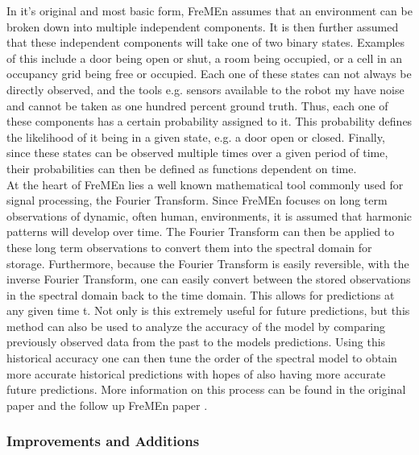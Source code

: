   In it's original and most basic form, FreMEn assumes that an environment can be
  broken down into multiple independent components. It is then further assumed
  that these independent components will take one of two binary states. Examples
  of this include a door being open or shut, a room being occupied, or a cell in
  an occupancy grid being free or occupied. Each one of these states can not
  always be directly observed, and the tools e.g. sensors available to the robot
  my have noise and cannot be taken as one hundred percent ground truth. Thus,
  each one of these components has a certain probability assigned to it. This
  probability defines the likelihood of it being in a given state, e.g. a door
  open or closed.  Finally, since these states can be observed multiple times
  over a given period of time, their probabilities can then be defined as
  functions dependent on time. \\

  At the heart of FreMEn lies a well known mathematical tool commonly used for
  signal processing, the Fourier Transform. Since FreMEn focuses on long term
  observations of dynamic, often human, environments, it is assumed that harmonic
  patterns will develop over time. The Fourier Transform can then be applied to
  these long term observations to convert them into the spectral domain for
  storage. Furthermore, because the Fourier Transform is easily reversible,
  with the inverse Fourier Transform, one can easily convert between the stored
  observations in the spectral domain back to the time domain. This allows for
  predictions at any given time t. Not only is this extremely useful for future
  predictions, but this method can also be used to analyze the accuracy of the
  model by comparing previously observed data from the past to the models
  predictions. Using this historical accuracy one can then tune the order of the
  spectral model to obtain more accurate historical predictions with hopes of
  also having more accurate future predictions. More information on this process
  can be found in the original paper\cite{Fentanes2014} and the follow up FreMEn
  paper \cite{Krajnik2015}. \\

  \subsubsection{ Improvements and Additions }

